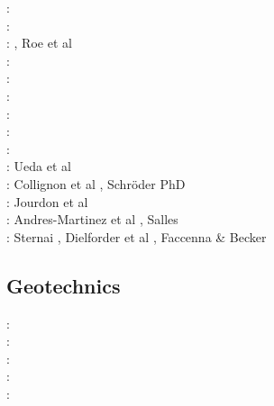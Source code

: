 \begin{scriptsize}
\twothousandsix: \cite{rosw06}\cite{brau06}\cite{bocr06}\cite{simp06}\cite{stwr06}\cite{golc06}\\
\twothousandseven: \cite{buto07}\cite{sebp07}\cite{tomk07}\cite{strw07}\\
\twothousandeight: \cite{alle08}, Roe et al \cite{rowf08}\\
\twothousandnine: \cite{whip09}\cite{kuhe09}\cite{makh09}\cite{pina09}\cite{dala09}\cite{bonn09}\\
\twothousandten: \cite{will10}\cite{tuha10}\cite{brau10}\cite{brau10}\cite{brya10}\cite{crmw10}\\
\twothousandeleven: \cite{robr11}\cite{grhd11}\\
\twothousandtwelve: \cite{kiwh12}\cite{brvv12}\\
\twothousandthirteen: \cite{vehc13}\cite{brwi13}\cite{fihv13a}\cite{fihv13b}\cite{brrs13}\cite{chgz13}\cite{tuva13}
      \cite{caya13} \\
\twothousandfourteen: \cite{crbr14}\cite{cokm14}\cite{erhv14}\cite{erhv15}\cite{stsc14}\cite{olbm14} \\
\twothousandfifteen: Ueda et al \cite{uewg15,fohk15,cofk15}\\
\twothousandsixteen: Collignon et al \cite{coyc16}, Schr{\"o}der PhD \cite{schr16}\\
\twothousandeighteen: Jourdon et al \cite{jolp18}\\
\twothousandnineteen: Andres-Martinez et al \cite{anpa19}, Salles \cite{sall19}\\
\twothousandtwenty: Sternai \cite{ster20}, Dielforder et al \cite{diho20}, Faccenna \& Becker \cite{fabe20}
\end{scriptsize}

\subsection{Geotechnics}

\begin{scriptsize}
\nineteenninetynine: \cite{ster99}\\
\twothousandthree: \cite{gora03}\cite{zhll03}\\
\twothousandfour: \cite{gour04}\\
\twothousandsix: \cite{gork06}\\
\twothousandfourteen: \cite{bufy14}
\end{scriptsize}

